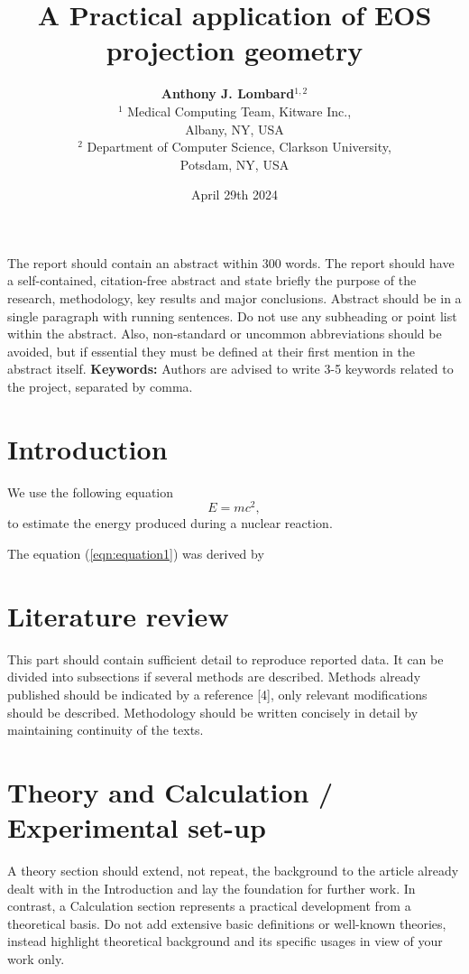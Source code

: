\documentclass[11pt,twocolumn]{article}
\title{\bf \Huge A Practical application of EOS projection geometry}
\author{{\bf \Large Anthony J. Lombard$^{1,2}$}\\
  $^1$ Medical Computing Team, Kitware Inc.,\\
  Albany, NY, USA\\
  $^2$ Department of Computer Science, Clarkson University,\\ 
  Potsdam, NY, USA
  }
\date{April 29th 2024}
\begin{document}
\maketitle

The report should contain an abstract within 300 words. The report should have a self-contained, citation-free abstract and state briefly the purpose of the research, methodology, key results and major conclusions. Abstract should be in a single paragraph with running sentences. Do not use any subheading or point list within the abstract. Also, non-standard or uncommon abbreviations should be avoided, but if essential they must be defined at their first mention in the abstract itself.  
\noindent
{\bf Keywords:} Authors are advised to write 3-5 keywords related to the project, separated by comma. 

\section{Introduction}

We use the following equation
\begin{equation}
E = mc^2, \label{eqn:equation1}
\end{equation}
to estimate the energy produced during a nuclear reaction. 

The equation (\ref{eqn:equation1}) was derived by 


\section{Literature review}
This part should contain sufficient detail to reproduce reported data. It can be divided into subsections if several methods are described. Methods already published should be indicated by a reference [4], only relevant modifications should be described. Methodology should be written concisely in detail by maintaining continuity of the texts. 

\section{Theory and Calculation / Experimental set-up}

A theory section should extend, not repeat, the background to the article already dealt with in the Introduction and lay the foundation for further work. In contrast, a Calculation section represents a practical development from a theoretical basis. Do not add extensive basic definitions or well-known theories, instead highlight theoretical background and its specific usages in view of your work only.
\end{document}
